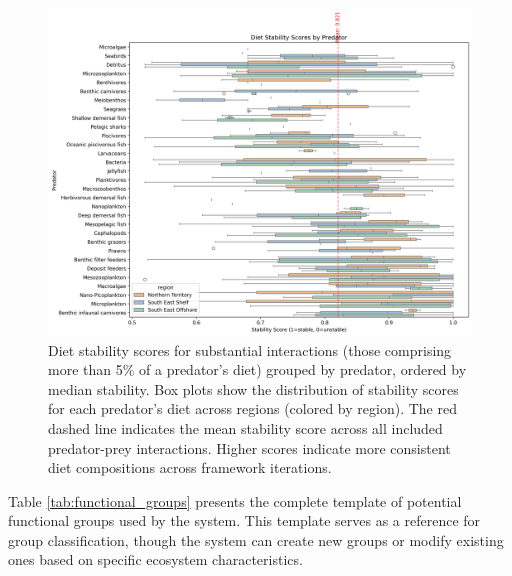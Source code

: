 \begin{figure}[htbp]
  \centering
  \includegraphics[width=\textwidth]{figures/predator_stability_boxplots.png}
  \caption{Diet stability scores for substantial interactions (those comprising more than 5\% of a predator's diet) grouped by predator, ordered by median stability. Box plots show the distribution of stability scores for each predator's diet across regions (colored by region). The red dashed line indicates the mean stability score across all included predator-prey interactions. Higher scores indicate more consistent diet compositions across framework iterations.}
  \label{fig:predator_stability}
\end{figure}



\label{supp:technical_implementation}
  
  Table \ref{tab:functional_groups} presents the complete template of potential functional groups used by the system. This template serves as a reference for group classification, though the system can create new groups or modify existing ones based on specific ecosystem characteristics.
  
